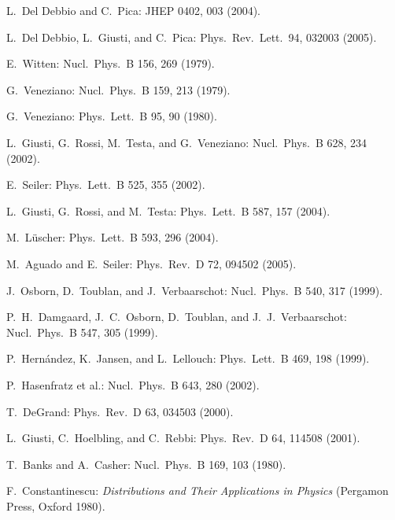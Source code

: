 \begin{enumerate}[label={[\arabic*]}]
  \item L.~Del Debbio and C.~Pica: JHEP 0402, 003 (2004).
  \item L.~Del Debbio, L.~Giusti, and C.~Pica: Phys.~Rev.~Lett.~94, 032003 (2005).
  \item E.~Witten: Nucl.~Phys.~B 156, 269 (1979).
  \item G.~Veneziano: Nucl.~Phys.~B 159, 213 (1979).
  \item G.~Veneziano: Phys.~Lett.~B 95, 90 (1980).
  \item L.~Giusti, G.~Rossi, M.~Testa, and G.~Veneziano: Nucl.~Phys.~B 628, 234 (2002).
  \item E.~Seiler: Phys.~Lett.~B 525, 355 (2002).
  \item L.~Giusti, G.~Rossi, and M.~Testa: Phys.~Lett.~B 587, 157 (2004).
  \item M.~L\"uscher: Phys.~Lett.~B 593, 296 (2004).
  \item M.~Aguado and E.~Seiler: Phys.~Rev.~D 72, 094502 (2005).
  \item J.~Osborn, D.~Toublan, and J.~Verbaarschot: Nucl.~Phys.~B 540, 317 (1999).
  \item P.~H.~Damgaard, J.~C.~Osborn, D.~Toublan, and J.~J.~Verbaarschot:
        Nucl.~Phys.~B 547, 305 (1999).
  \item P.~Hern\'andez, K.~Jansen, and L.~Lellouch: Phys.~Lett.~B 469, 198 (1999).
  \item P.~Hasenfratz et al.: Nucl.~Phys.~B 643, 280 (2002).
  \item T.~DeGrand: Phys.~Rev.~D 63, 034503 (2000).
  \item L.~Giusti, C.~Hoelbling, and C.~Rebbi: Phys.~Rev.~D 64, 114508 (2001).
  \item T.~Banks and A.~Casher: Nucl.~Phys.~B 169, 103 (1980).
  \item F.~Constantinescu: \emph{Distributions and Their Applications in
        Physics} (Pergamon Press, Oxford 1980).
\end{enumerate}
